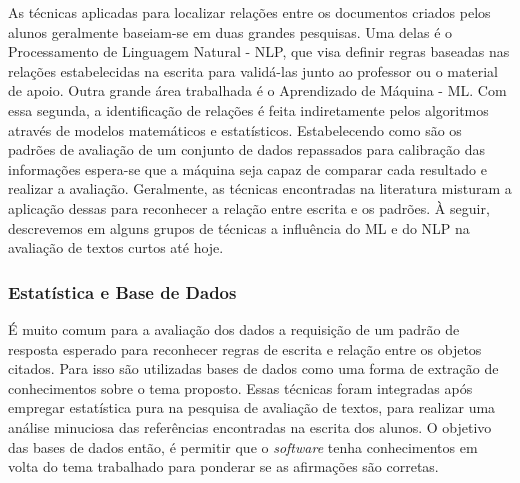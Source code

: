 As técnicas aplicadas para localizar relações entre os documentos criados pelos alunos geralmente baseiam-se em duas grandes pesquisas. Uma delas é o Processamento de Linguagem Natural - NLP, que visa definir regras baseadas nas relações estabelecidas na escrita para validá-las junto ao professor ou o material de apoio. Outra grande área trabalhada é o Aprendizado de Máquina - ML. Com essa segunda, a identificação de relações é feita indiretamente pelos algoritmos através de modelos matemáticos e estatísticos. Estabelecendo como são os padrões de avaliação de um conjunto de dados repassados para calibração das informações espera-se que a máquina seja capaz de comparar cada resultado e realizar a avaliação. Geralmente, as técnicas encontradas na literatura misturam a aplicação dessas para reconhecer a relação entre escrita e os padrões. À seguir, descrevemos em alguns grupos de técnicas a influência do ML e do NLP na avaliação de textos curtos até hoje.

\subsubsection{Estatística e Base de Dados} \label{ss:STAT}
É muito comum para a avaliação dos dados a requisição de um padrão de resposta esperado para reconhecer regras de escrita e relação entre os objetos citados. Para isso são utilizadas bases de dados como uma forma de extração de conhecimentos sobre o tema proposto. Essas técnicas foram integradas após  empregar estatística pura na pesquisa de avaliação de textos, para realizar uma análise minuciosa das referências encontradas na escrita dos alunos. O objetivo das bases de dados então, é permitir que o \textit{software} tenha conhecimentos em volta do tema trabalhado para ponderar se as afirmações são corretas.

